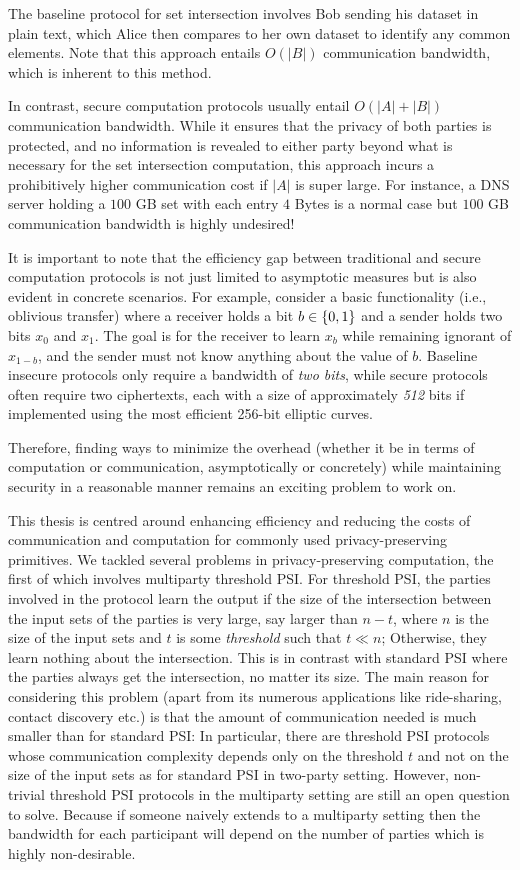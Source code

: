 The baseline protocol for set intersection involves Bob sending his dataset in plain text, which Alice then compares to her own dataset to identify any common elements. Note that this approach entails $O(|B|)$ communication bandwidth, which is inherent to this method.

In contrast, secure computation protocols usually entail $O(|A|+|B|)$ communication bandwidth. While it ensures that the privacy of both parties is protected, and no information is revealed to either party beyond what is necessary for the set intersection computation, this approach incurs a prohibitively higher communication cost if $|A|$ is super large. For instance, a DNS server holding a $100$ GB set with each entry $4$ Bytes is a normal case but $100$ GB communication bandwidth is highly undesired!

It is important to note that the efficiency gap between traditional and secure computation protocols is not just limited to asymptotic measures but is also evident in concrete scenarios. For example, consider a basic functionality (i.e., oblivious transfer) where a receiver holds a bit $b \in \{0,1\}$ and a sender holds two bits $x_0$ and $x_1$. The goal is for the receiver to learn $x_b$ while remaining ignorant of $x_{1-b}$, and the sender must not know anything about the value of $b$. Baseline insecure protocols only require a bandwidth of \emph{two bits}, while secure protocols often require two ciphertexts, each with a size of approximately \emph{512} bits if implemented using the most efficient 256-bit elliptic curves.

Therefore, finding ways to minimize the overhead (whether it be in terms of computation or communication, asymptotically or concretely) while maintaining security in a reasonable manner remains an exciting problem to work on.

This thesis is centred around enhancing efficiency and reducing the costs of communication and computation for commonly used privacy-preserving primitives.
We tackled several problems in privacy-preserving computation, the first of which involves multiparty threshold PSI.
For threshold PSI, the parties involved in the protocol learn the output if the size of the intersection between the input sets of the parties is very large, say larger than $n-t$, where $n$ is the size of the input sets and $t$ is some \emph{threshold} such that $t\ll n$; Otherwise, they learn nothing about the intersection. This is in contrast with standard PSI where the parties always get the intersection, no matter its size.
The main reason for considering this problem (apart from its numerous applications like ride-sharing, contact discovery etc.) is that the amount of communication needed is much smaller than for standard PSI: In particular, there are threshold PSI protocols whose communication complexity depends only on the threshold $t$ and not on the size of the input sets as for standard PSI \cite{C:GhoSim19} in two-party setting. 
However, non-trivial threshold PSI protocols in the multiparty setting are still an open question to solve. Because if someone naively extends \cite{C:GhoSim19} to a multiparty setting then the bandwidth for each participant will depend on the number of parties which is highly non-desirable.

